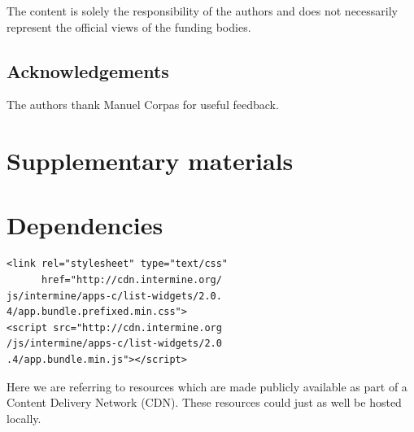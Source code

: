 \documentclass[10pt,a4paper,twocolumn]{article}
\begin{document}
The content is solely the responsibility of the authors and does not necessarily
represent the official views of the funding bodies.

\subsection*{Acknowledgements}

The authors thank Manuel Corpas for useful feedback.

\nocite{*}
{\small
}

\section*{Supplementary materials}
\appendix
\section{Dependencies} \label{app:deps}

\lstset{language=HTML}

\begin{lstlisting}
<link rel="stylesheet" type="text/css"
      href="http://cdn.intermine.org/
js/intermine/apps-c/list-widgets/2.0.
4/app.bundle.prefixed.min.css">
<script src="http://cdn.intermine.org
/js/intermine/apps-c/list-widgets/2.0
.4/app.bundle.min.js"></script>
\end{lstlisting}

Here we are referring to resources which are made publicly available
as part of a Content Delivery Network (CDN). These resources could just
as well be hosted locally.





\end{document}
